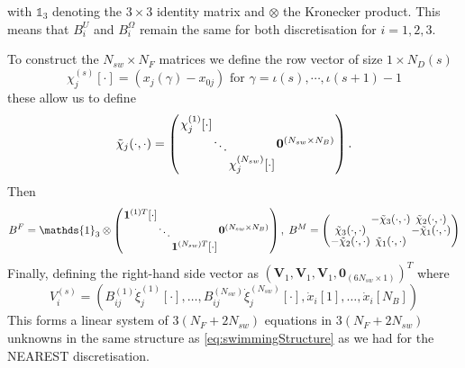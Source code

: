 with $\mathds{1}_{3}$ denoting the $3\times3$ identity matrix and $\otimes$ the Kronecker product. This means that $B^U_i$ and $B_i^\Omega$ remain the same for both discretisation for $i=1,2,3$. 

To construct the $N_{sw} \times N_F$ matrices we define the row vector of size $1 \times N_D(s)$ 
\begin{equation*}
    \chi_j^{(s)}[\cdot] = (x_j(\gamma) - x_{0 j}) \text{ for } \gamma = \iota(s),\cdots,\iota(s+1)-1
\end{equation*}
these allow us to define
\begin{equation*}
\arraycolsep=0.4pt\def\arraystretch{0.75}
    \tilde{\chi}_j(\cdot,\cdot)=\left(\begin{array}{cc}
         \begin{array}{ccc}
             \chi_j^{(1)}[\cdot] & & \\
              & \ddots & \\
              & & \chi_j^{(N_{sw})}[\cdot]
         \end{array} & \bm{0}^{(N_{sw} \times N_B)}
    \end{array}\right).
\end{equation*}
Then
\begin{equation*}
\arraycolsep=0.4pt\def\arraystretch{0.75}
    B^F = \mathds{1}_{3} \otimes \left(\begin{array}{cc}
         \begin{array}{ccc}
             \bm{1}^{(1)T}[\cdot] & & \\
              & \ddots & \\
              & & \bm{1}^{(N_{sw})T}[\cdot]
         \end{array} & \bm{0}^{(N_{sw} \times N_B)}
    \end{array}\right), \;
    B^M =
    \left(\begin{array}{ccc}
             & -\tilde{\chi}_3(\cdot,\cdot) & \tilde{\chi}_2(\cdot,\cdot)\\
            \tilde{\chi}_3(\cdot,\cdot) & & -\tilde{\chi}_1(\cdot,\cdot)\\
            -\tilde{\chi}_2(\cdot,\cdot) & \tilde{\chi}_1(\cdot,\cdot) &
          \end{array}\right)
\end{equation*}
Finally, defining the right-hand side vector as $(\bm{V}_1,\bm{V}_1,\bm{V}_1,\bm{0}_{(6N_{sw} \times 1)})^T$ where
\begin{equation*}
    V_i^{(s)} = (B_{ij}^{(1)}\dot{\xi}_j^{(1)}[\cdot],\dots,B_{ij}^{(N_{sw})}\dot{\xi}_j^{(N_{sw})}[\cdot],\dot{x}_i[1],\dots,\dot{x}_i[N_B])
\end{equation*}
This forms a linear system of $3(N_F+2N_{sw})$ equations in $3(N_F+2N_{sw})$ unknowns in the same structure as \cref{eq:swimmingStructure} as we had for the NEAREST discretisation.

